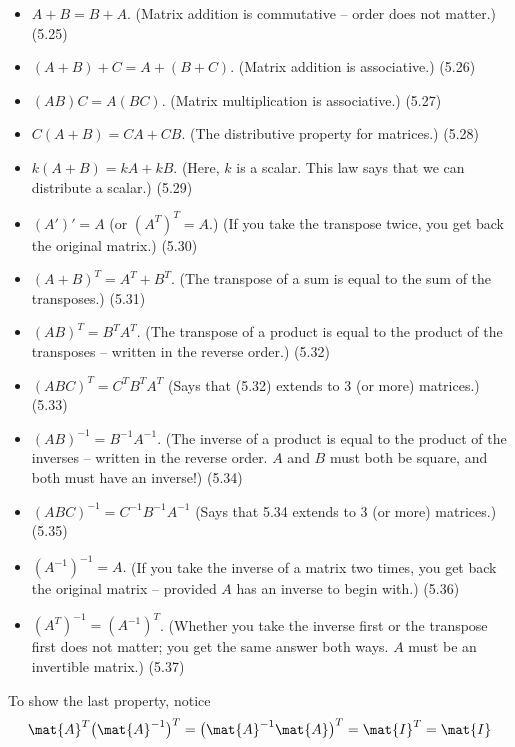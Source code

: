 \documentclass[12pt]{article}
\begin{document}
\begin{itemize}
\item $A + B = B + A$.  (Matrix addition is commutative -- order does not matter.) (5.25)
\item $(A+B)+C = A+(B+C)$. (Matrix addition is associative.) (5.26)
\item $(AB)C = A(BC)$. (Matrix multiplication is associative.) (5.27)
\item $C(A+B) = CA + CB$. (The distributive property for matrices.) (5.28)
\item $k(A+B) = kA + kB.$ (Here, $k$ is a scalar. This law says that we can distribute a scalar.) (5.29)
\item $(A')' = A$ (or $(A^T)^T = A$.) (If you take the transpose twice,
 you get back the original matrix.) (5.30)
\item $(A+B)^T = A^T + B^T$. (The transpose of a sum is equal to the sum of the transposes.) (5.31)
\item $(AB)^T = B^T A^T$. (The transpose of a product is equal to the product of the transposes --
written in the reverse order.) (5.32)
\item $(ABC)^T = C^T B^T A^T$ (Says that (5.32) extends to 3 (or more) matrices.) (5.33)
\item $(AB)^{-1} = B^{-1}A^{-1}$. (The inverse of a product is equal to the product of the inverses --
written in the reverse order.  $A$ and $B$ must both be square, and both must have an inverse!) (5.34)
\item $(ABC)^{-1} = C^{-1}B^{-1}A^{-1}$ (Says that 5.34 extends to 3 (or more) matrices.) (5.35)
\item $(A^{-1})^{-1} = A.$ (If you take the inverse of a matrix two times, you get back the
original matrix -- provided $A$ has an inverse to begin with.) (5.36)
\item $(A^T)^{-1} = (A^{-1})^T$.  (Whether you take the inverse first or the transpose first
does not matter; you get the same answer both ways.  $A$ must be an invertible matrix.) (5.37)
\end{itemize}

To show the last property, notice
\[
\mat{A}^{T} \bigl(\mat{A}^{-1}\bigr)^T
= \bigl(\mat{A}^{-1}\mat{A}\bigr)^T
= \mat{I}^T
= \mat{I}
\]
\end{document}
